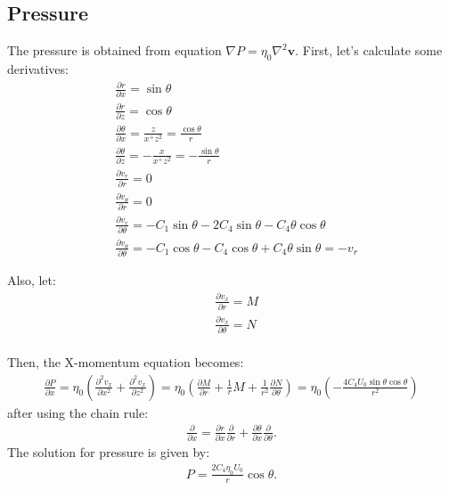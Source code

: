 \documentclass[a4paper,11pt]{article}
\begin{document}
\subsection{Pressure}
The pressure is obtained from equation $\nabla P = \eta_0\nabla^2\textbf{v}$. First, let's calculate some derivatives:
\begin{align}
&\frac{\partial r}{\partial x} = \sin\theta\\
&\frac{\partial r}{\partial z} = \cos\theta\\
&\frac{\partial \theta}{\partial x} = \frac{z}{x^+z^2} = \frac{\cos\theta}{r}\\
&\frac{\partial \theta}{\partial z} = -\frac{x}{x^+z^2} = -\frac{\sin\theta}{r}\\
&\frac{\partial v_r}{\partial r} = 0\\
&\frac{\partial v_\theta}{\partial r} = 0\\
&\frac{\partial v_r}{\partial \theta} = -C_1\sin\theta-2C_4\sin\theta-C_4\theta\cos\theta\\
&\frac{\partial v_\theta}{\partial \theta} = -C_1\cos\theta-C_4\cos\theta+C_4\theta\sin\theta = -v_r
\end{align}

Also, let:
\begin{align}
&\frac{\partial v_x}{\partial r} = M\\
&\frac{\partial v_x}{\partial \theta} = N\\
\end{align}

Then, the X-momentum equation becomes:
\begin{align}
\frac{\displaystyle \partial P}{\displaystyle \partial x}=\eta_0\left(\frac{\displaystyle \partial^2 v_x}{\displaystyle \partial x^2} + \frac{\displaystyle \partial^2 v_x}{\displaystyle \partial z^2}\right) = \eta_0\left(\frac{\partial M}{\partial r} + \frac{1}{r}M +\frac{1}{r^2}\frac{\partial N}{\partial \theta}\right) = \eta_0\left( -\frac{4C_4U_0\sin\theta\cos\theta}{r^2}\right)
\end{align}
after using the chain rule:
\begin{align}
 \frac{\partial}{\partial x}=\frac{\partial r}{\partial x}\frac{\partial}{\partial r}+\frac{\partial \theta}{\partial x}\frac{\partial}{\partial \theta}.
 \end{align}
The solution for pressure is given by:
\begin{align}
P =  \frac{2C_4\eta_0 U_0}{r}\cos\theta.
 \end{align}


%


\end{document}
